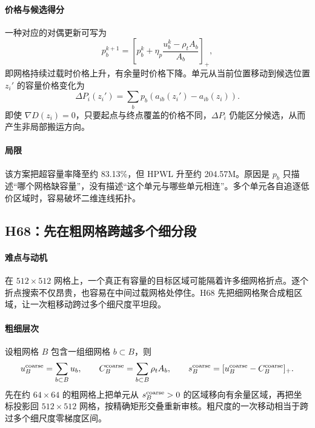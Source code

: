 \documentclass[UTF8,a4paper,11pt]{ctexrep}
\begin{document}
\paragraph{价格与候选得分}
一种对应的对偶更新可写为
\begin{equation}
 p_b^{k+1}=\left[p_b^k+\eta_p
 \frac{u_b^k-\rho_tA_b}{A_b}\right]_+, \label{eq:binprice}
\end{equation}
即网格持续过载时价格上升，有余量时价格下降。单元从当前位置移动到候选位置 $z_i'$ 的容量价格变化为
\begin{equation}
 \Delta P_i(z_i')=\sum_b p_b
 \left(a_{ib}(z_i')-a_{ib}(z_i)\right). \label{eq:pricedelta}
\end{equation}
即使 $\nabla D(z_i)=0$，只要起点与终点覆盖的价格不同，$\Delta P_i$ 仍能区分候选，从而产生非局部搬运方向。

\paragraph{局限}
该方案把超容量率降至约 83.13\%，但 HPWL 升至约 204.57M。原因是 $p_b$ 只描述“哪个网格缺容量”，没有描述“这个单元与哪些单元相连”。多个单元各自追逐低价区域时，容易破坏二维连线拓扑。

\subsection{H68：先在粗网格跨越多个细分段}
\paragraph{难点与动机}
在 $512\times512$ 网格上，一个真正有容量的目标区域可能隔着许多细网格折点。逐个折点搜索不仅昂贵，也容易在中间过载网格处停住。H68 先把细网格聚合成粗区域，让一次粗移动跨过多个细尺度平坦段。

\paragraph{粗细层次}
设粗网格 $B$ 包含一组细网格 $b\subset B$，则
\begin{equation}
 u_B^{\rm coarse}=\sum_{b\subset B}u_b,
 \qquad C_B^{\rm coarse}=\sum_{b\subset B}\rho_tA_b,
 \qquad s_B^{\rm coarse}=[u_B^{\rm coarse}-C_B^{\rm coarse}]_+. \label{eq:coarsecapacity}
\end{equation}
先在约 $64\times64$ 的粗网格上把单元从 $s_B^{\rm coarse}>0$ 的区域移向有余量区域，再把坐标投影回 $512\times512$ 网格，按精确矩形交叠重新审核。粗尺度的一次移动相当于跨过多个细尺度零梯度区间。
\end{document}
